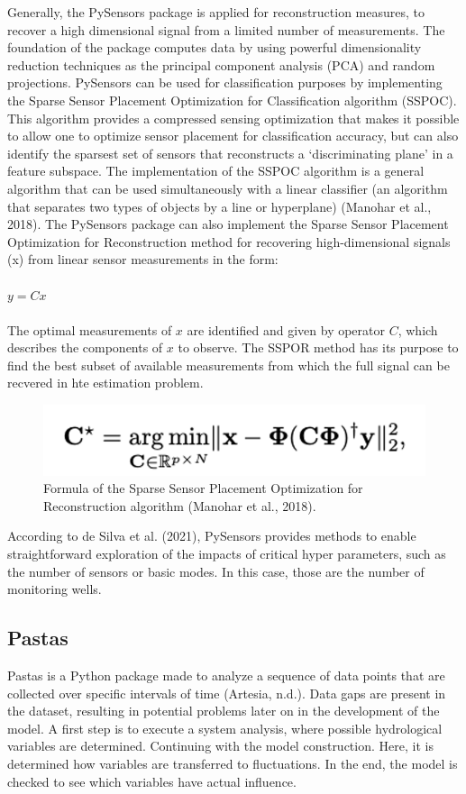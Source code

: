 Generally, the PySensors package is applied for reconstruction measures, to recover a high dimensional signal from a limited number of measurements. The foundation of the package computes data by using powerful dimensionality reduction techniques as the principal component analysis (PCA) and random projections. PySensors can be used for classification purposes by implementing the Sparse Sensor Placement Optimization for Classification algorithm (SSPOC). This algorithm provides a compressed sensing optimization that makes it possible to allow one to optimize sensor placement for classification accuracy, but can also identify the sparsest set of sensors that reconstructs a ‘discriminating plane’ in a feature subspace. The implementation of the SSPOC algorithm is a general algorithm that can be used simultaneously with a linear classifier (an algorithm that separates two types of objects by a line or hyperplane) (Manohar et al., 2018). The PySensors package can also implement the Sparse Sensor Placement Optimization for Reconstruction method for recovering high-dimensional signals (x) from linear sensor measurements in the form: \\
\\
\(y = Cx\)\\
\\
The optimal measurements of \(x\) are identified and given by operator \(C\), which describes the components of \(x\) to observe. The SSPOR method has its purpose to find the best subset of available measurements from which the full signal can be recvered in hte estimation problem. 
\begin{figure}[htbp]
    \centering
    \includegraphics[width=0.5\linewidth]{appendix/pysensors.png}
    \caption{Formula of the Sparse Sensor Placement Optimization for Reconstruction algorithm (Manohar et al., 2018).}
    \label{Pysensors}
\end{figure}
According to de Silva et al. (2021), PySensors provides methods to enable straightforward exploration of the impacts of critical hyper parameters, such as the number of sensors or basic modes. In this case, those are the number of monitoring wells. 


\subsection{Pastas}
Pastas is a Python package made to analyze a sequence of data points that are collected over specific intervals of time (Artesia, n.d.). Data gaps are present in the dataset, resulting in potential problems later on in the development of the model. A first step is to execute a system analysis, where possible hydrological variables are determined. Continuing with the model construction. Here, it is determined how variables are transferred to fluctuations. In the end, the model is checked to see which variables have actual influence. 

